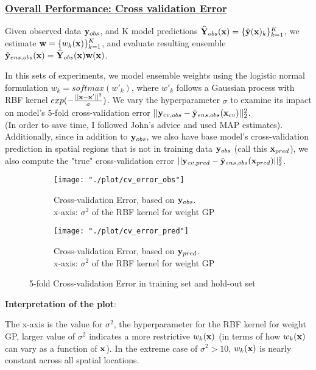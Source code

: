 \documentclass[11pt]{article}
\theoremstyle{definition}
\begin{document}
\newpage
\subsubsection{\underline{Overall Performance: Cross validation Error}}
Given observed data ${\bf y}_{obs}$, and K model predictions $\widehat{{\bf Y}}_{obs}({\bf x}) = \{\hat{{\bf y}}({\bf x})_{k}\}_{k=1}^K$,  we estimate ${\bf w} = \{ w_k({\bf x})\}_{k=1}^K$, and evaluate resulting ensemble $\hat{{\bf y}}_{ens, obs}({\bf x}) = \widehat{{\bf Y}}_{obs}({\bf x}){\bf w}({\bf x}) $.

In this sets of experiments, we model ensemble weights using the logistic normal formulation $w_k = softmax(w'_k)$, where $w'_k$ follows a Gaussian process with RBF kernel $exp(-\frac{||{\bf x} - {\bf x}'||^2}{\sigma})$. We vary the hyperparameter $\sigma$ to examine its impact on model's 5-fold cross-validation error $||{\bf y}_{cv, obs} - \hat{{\bf y}}_{ens, obs}({\bf x}_{cv})||_2^2$. \\
(In order to save time, I followed John's advice and used MAP estimates).\\

Additionally, since in addition to ${\bf y}_{obs}$, we also have base model's cross-validation prediction in spatial regions that is not in training data ${\bf y}_{obs}$ (call this ${\bf x}_{pred}$), we also compute the "true" cross-validation error $||{\bf y}_{cv, pred} - \hat{{\bf y}}_{ens, obs}({\bf x}_{pred})||_2^2$.

\begin{figure}[ht]
\centering
\begin{subfigure}{.48\textwidth}
  \centering
  \texttt{[image: "./plot/cv\_error\_obs"]}
  \caption{Cross-validation Error, based on ${\bf y}_{obs}$.\\
  x-axis: $\sigma^2$ of the RBF kernel for weight GP}
\end{subfigure}
\begin{subfigure}{.48\textwidth}
  \centering
  \texttt{[image: "./plot/cv\_error\_pred"]}
  \caption{Cross-validation Error, based on ${\bf y}_{pred}$.\\
  x-axis: $\sigma^2$ of the RBF kernel for weight GP}
\end{subfigure}\hspace*{-0.1em}
\caption{5-fold Cross-validation Error in training set and hold-out set}
\label{fig:cv_error}
\end{figure}

\textbf{Interpretation of the plot}: 

The x-axis is the value for $\sigma^2$, the hyperparameter for the RBF kernel for weight GP, larger value of $\sigma^2$ indicates a more restrictive $w_k({\bf x})$ (in terms of how $w_k({\bf x})$ can vary as a function of ${\bf x}$). In the extreme case of $\sigma^2 > 10$, $w_k({\bf x})$ is nearly constant across all spatial locations.\\
\end{document}
